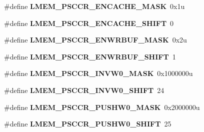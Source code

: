 \begin{DoxyCompactItemize}
\item 
\hypertarget{group___l_m_e_m___register___masks_gad1e29271d9b2aa463cc4bec002fee996}{}\#define {\bfseries L\+M\+E\+M\+\_\+\+P\+S\+C\+C\+R\+\_\+\+E\+N\+C\+A\+C\+H\+E\+\_\+\+M\+A\+S\+K}~0x1u\label{group___l_m_e_m___register___masks_gad1e29271d9b2aa463cc4bec002fee996}

\item 
\hypertarget{group___l_m_e_m___register___masks_gae6cc75891694758df89850f0560923db}{}\#define {\bfseries L\+M\+E\+M\+\_\+\+P\+S\+C\+C\+R\+\_\+\+E\+N\+C\+A\+C\+H\+E\+\_\+\+S\+H\+I\+F\+T}~0\label{group___l_m_e_m___register___masks_gae6cc75891694758df89850f0560923db}

\item 
\hypertarget{group___l_m_e_m___register___masks_ga4581c6811c07d5b02e03e3fdd7665e6f}{}\#define {\bfseries L\+M\+E\+M\+\_\+\+P\+S\+C\+C\+R\+\_\+\+E\+N\+W\+R\+B\+U\+F\+\_\+\+M\+A\+S\+K}~0x2u\label{group___l_m_e_m___register___masks_ga4581c6811c07d5b02e03e3fdd7665e6f}

\item 
\hypertarget{group___l_m_e_m___register___masks_gaf800162ff536ccc05c29e8620732d109}{}\#define {\bfseries L\+M\+E\+M\+\_\+\+P\+S\+C\+C\+R\+\_\+\+E\+N\+W\+R\+B\+U\+F\+\_\+\+S\+H\+I\+F\+T}~1\label{group___l_m_e_m___register___masks_gaf800162ff536ccc05c29e8620732d109}

\item 
\hypertarget{group___l_m_e_m___register___masks_gaef5c951956a2e3306caf97041a537df3}{}\#define {\bfseries L\+M\+E\+M\+\_\+\+P\+S\+C\+C\+R\+\_\+\+I\+N\+V\+W0\+\_\+\+M\+A\+S\+K}~0x1000000u\label{group___l_m_e_m___register___masks_gaef5c951956a2e3306caf97041a537df3}

\item 
\hypertarget{group___l_m_e_m___register___masks_ga35fb46a40b3108fb32c1bda28808afbe}{}\#define {\bfseries L\+M\+E\+M\+\_\+\+P\+S\+C\+C\+R\+\_\+\+I\+N\+V\+W0\+\_\+\+S\+H\+I\+F\+T}~24\label{group___l_m_e_m___register___masks_ga35fb46a40b3108fb32c1bda28808afbe}

\item 
\hypertarget{group___l_m_e_m___register___masks_ga6dcb39749df4ee77ac1b911b010ca02d}{}\#define {\bfseries L\+M\+E\+M\+\_\+\+P\+S\+C\+C\+R\+\_\+\+P\+U\+S\+H\+W0\+\_\+\+M\+A\+S\+K}~0x2000000u\label{group___l_m_e_m___register___masks_ga6dcb39749df4ee77ac1b911b010ca02d}

\item 
\hypertarget{group___l_m_e_m___register___masks_gac894e63c44f0a00bf09a2c7a884ff548}{}\#define {\bfseries L\+M\+E\+M\+\_\+\+P\+S\+C\+C\+R\+\_\+\+P\+U\+S\+H\+W0\+\_\+\+S\+H\+I\+F\+T}~25\label{group___l_m_e_m___register___masks_gac894e63c44f0a00bf09a2c7a884ff548}


\end{DoxyCompactItemize}
